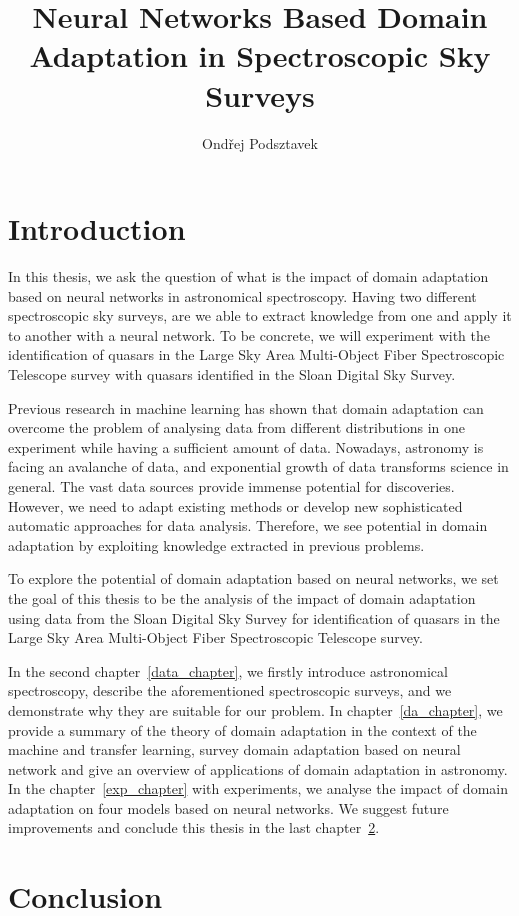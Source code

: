 \documentclass[thesis=M,english]{FITthesis}[2012/10/20]
\title{Neural Networks Based Domain Adaptation in Spectroscopic Sky Surveys}
\author{Ondřej Podsztavek}
\begin{document}
\chapter{Introduction}

In this thesis, we ask the question of what is the impact of domain adaptation based on neural networks in astronomical spectroscopy. Having two different spectroscopic sky surveys, are we able to extract knowledge from one and apply it to another with a neural network. To be concrete, we will experiment with the identification of quasars in the Large Sky Area Multi-Object Fiber Spectroscopic Telescope survey with quasars identified in the Sloan Digital Sky Survey.

Previous research in machine learning has shown that domain adaptation can overcome the problem of analysing data from different distributions in one experiment while having a sufficient amount of data. Nowadays, astronomy is facing an avalanche of data, and exponential growth of data transforms science in general. The vast data sources provide immense potential for discoveries. However, we need to adapt existing methods or develop new sophisticated automatic approaches for data analysis. Therefore, we see potential in domain adaptation by exploiting knowledge extracted in previous problems.

To explore the potential of domain adaptation based on neural networks, we set the goal of this thesis to be the analysis of the impact of domain adaptation using data from the Sloan Digital Sky Survey for identification of quasars in the Large Sky Area Multi-Object Fiber Spectroscopic Telescope survey.

In the second chapter~\ref{data_chapter}, we firstly introduce astronomical spectroscopy, describe the aforementioned spectroscopic surveys, and we demonstrate why they are suitable for our problem.
In chapter~\ref{da_chapter}, we provide a summary of the theory of domain adaptation in the context of the machine and transfer learning,  survey domain adaptation based on neural network and give an overview of applications of domain adaptation in astronomy.
In the chapter~\ref{exp_chapter} with experiments, we analyse the impact of domain adaptation on four models based on neural networks. We suggest future improvements and conclude this thesis in the last chapter~\ref{conclusion}.





\chapter{Conclusion}
\label{conclusion}
\end{document}
